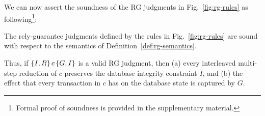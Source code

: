 We can now assert the soundness of the RG judgments in
Fig.~\ref{fig:rg-rules} as following\footnote{Formal proof of soundness
is provided in the supplementary material.}:

\begin{theorem} 
The rely-guarantee judgments defined by the rules in
Fig.~\ref{fig:rg-rules} are sound with respect to the semantics of
Definition~\ref{def:rg-semantics}.
\end{theorem}

\noindent Thus, if $\{I,R\}\,c\,\{G,I\}$ is a valid RG judgment, then (a)
every interleaved multi-step reduction of $c$ preserves the database
integrity constraint $I$, and (b) the effect that every transaction in
$c$ has on the database state is captured by $G$.  


